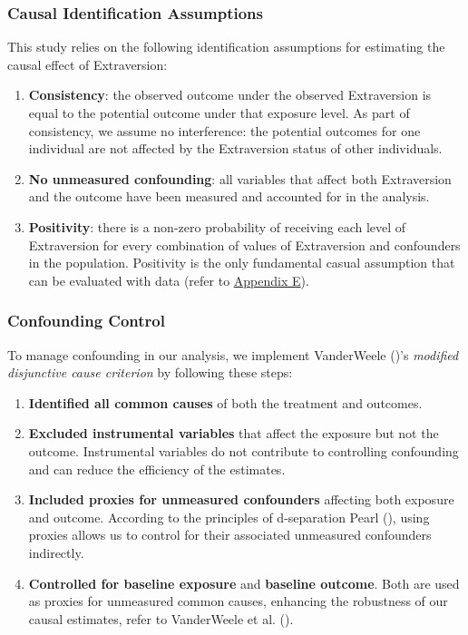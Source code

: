 \documentclass[
  single column]{article}
\providecommand{\tightlist}{%
  \setlength{\itemsep}{0pt}\setlength{\parskip}{0pt}}
\begin{document}
\subsubsection{Causal Identification
Assumptions}\label{causal-identification-assumptions}

This study relies on the following identification assumptions for
estimating the causal effect of Extraversion:

\begin{enumerate}
\def\labelenumi{\arabic{enumi}.}
\item
  \textbf{Consistency}: the observed outcome under the observed
  Extraversion is equal to the potential outcome under that exposure
  level. As part of consistency, we assume no interference: the
  potential outcomes for one individual are not affected by the
  Extraversion status of other individuals.
\item
  \textbf{No unmeasured confounding}: all variables that affect both
  Extraversion and the outcome have been measured and accounted for in
  the analysis.
\item
  \textbf{Positivity}: there is a non-zero probability of receiving each
  level of Extraversion for every combination of values of Extraversion
  and confounders in the population. Positivity is the only fundamental
  casual assumption that can be evaluated with data (refer to
  \hyperref[appendix-positivity]{Appendix E}).
\end{enumerate}

\subsubsection{Confounding Control}\label{confounding-control}

To manage confounding in our analysis, we implement VanderWeele
()'s \emph{modified disjunctive
cause criterion} by following these steps:

\begin{enumerate}
\def\labelenumi{\arabic{enumi}.}
\tightlist
\item
  \textbf{Identified all common causes} of both the treatment and
  outcomes.
\item
  \textbf{Excluded instrumental variables} that affect the exposure but
  not the outcome. Instrumental variables do not contribute to
  controlling confounding and can reduce the efficiency of the
  estimates.
\item
  \textbf{Included proxies for unmeasured confounders} affecting both
  exposure and outcome. According to the principles of d-separation
  Pearl (), using proxies allows us to
  control for their associated unmeasured confounders indirectly.
\item
  \textbf{Controlled for baseline exposure} and \textbf{baseline
  outcome}. Both are used as proxies for unmeasured common causes,
  enhancing the robustness of our causal estimates, refer to VanderWeele
  et al. ().
\end{enumerate}
\end{document}

